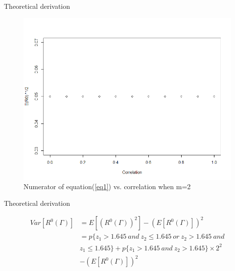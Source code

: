 \documentclass{beamer}
\begin{document}
\begin{frame}[t]{Theoretical derivation}\vspace{10pt}
\begin{figure}[h]
	\centering
	\includegraphics[scale=0.35]{exact_m=2}
	\caption{\footnotesize{Numerator of equation(\ref{eq1}) vs. correlation when m=2}}
	\label{fig1}
\end{figure}
\end{frame}

\begin{frame}[t]{Theoretical derivation}\vspace{10pt}

\begin{equation} \label{eq3}
\begin{split}
Var[R^0(\Gamma)] &= E[(R^0(\Gamma))^2] - (E[R^0(\Gamma)])^2 \\
&= p\{z_1 > 1.645 \ and \ z_2 \leq 1.645 \ or \ z_2 > 1.645 \ and \\ 
&z_1 \leq 1.645 \}  + p\{z_1 > 1.645 \ and \ z_2 > 1.645 \} \times 2^2 \\
&- (E[R^0(\Gamma)])^2
\end{split}
\end{equation}

\end{frame}
\end{document}

